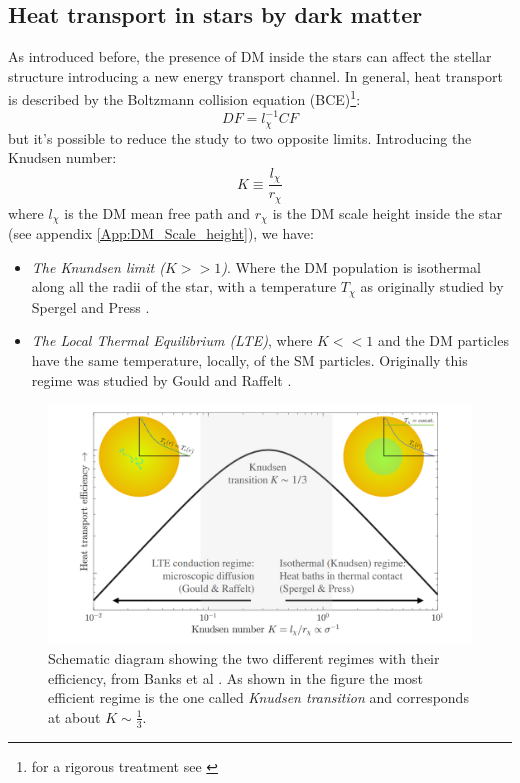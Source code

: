 \subsection{ Heat transport in stars by dark matter}
As introduced before, the presence of DM inside the stars can affect the stellar structure introducing a new energy transport channel. In general, heat transport is described by the Boltzmann collision equation (BCE)\cite{GouldRaffelt_Cond}\footnote{for a rigorous treatment see \cite{Vincent_2014}}:
\begin{equation*}
    DF=l_{\chi}^{-1}CF
\end{equation*}
but it's possible to reduce the study to two opposite limits. Introducing the Knudsen number:
\begin{equation*}
    K\equiv\frac{l_{\chi}}{r_{\chi}}
\end{equation*}
where $l_{\chi}$ is the DM mean free path and $r_{\chi}$ is the DM scale height inside the star (see appendix \ref{App:DM_Scale_height}), we have:
\begin{itemize}
    \item \textit{The Knundsen limit ($K>>1$)}. Where the DM population is isothermal along all the radii of the star, with a temperature $T_{\chi}$ as originally studied by Spergel and Press \cite{SpergelPress_Cond}.

    \item \textit{The Local Thermal Equilibrium (LTE)}, where $K<<1$ and the DM particles have the same temperature, locally, of the SM particles. Originally this regime was studied by Gould and Raffelt \cite{GouldRaffelt_Cond}.
\end{itemize}
\begin{figure}[H]
    \centering
    \includegraphics[width=.9\textwidth,height=.34\textheight]{figures/Regimi_conduzione_calore.png}
    \caption{Schematic diagram showing the two different regimes with their efficiency, from Banks et al \cite{Banks_2022}. As shown in the figure the most efficient regime is the one called \textit{Knudsen transition} and corresponds at about $K\sim \frac{1}{3}$.}
    \label{fig:Conductive_regimes}
\end{figure}

